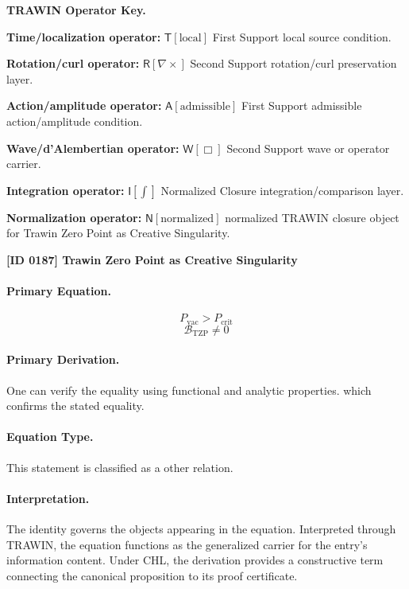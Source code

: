 \par\vspace{0.45\baselineskip}
\noindent\begin{minipage}[t]{\linewidth}
\begingroup
\small
\raggedright
\textbf{TRAWIN Operator Key.}\par
\noindent\textbf{Time/localization operator:} $\mathsf{T}\!\left[\mathrm{local}\right]$ First Support local source condition.\par
\noindent\textbf{Rotation/curl operator:} $\mathsf{R}\!\left[\nabla\times\right]$ Second Support rotation/curl preservation layer.\par
\noindent\textbf{Action/amplitude operator:} $\mathsf{A}\!\left[\mathrm{admissible}\right]$ First Support admissible action/amplitude condition.\par
\noindent\textbf{Wave/d'Alembertian operator:} $\mathsf{W}\!\left[\Box\right]$ Second Support wave or operator carrier.\par
\noindent\textbf{Integration operator:} $\mathsf{I}\!\left[\int\right]$ Normalized Closure integration/comparison layer.\par
\noindent\textbf{Normalization operator:} $\mathsf{N}\!\left[\mathrm{normalized}\right]$ normalized TRAWIN closure object for Trawin Zero Point as Creative Singularity.\par
\endgroup
\end{minipage}

\clearpage
\noindent\textbf{[ID 0187] Trawin Zero Point as Creative Singularity}\par
\vspace{0.35em}
\paragraph{Primary Equation.}
\[
P_{\mathrm{vac}} > P_{\mathrm{crit}}
\]
\[
\mathcal{B}_{\mathrm{TZP}} \neq 0
\]

\paragraph{Primary Derivation.}
One can verify the equality using functional and analytic properties. which confirms the stated equality.
\paragraph{Equation Type.}
This statement is classified as a other relation.

\paragraph{Interpretation.}
The identity governs the objects appearing in the equation. Interpreted through TRAWIN, the equation functions as the generalized carrier for the entry’s information content. Under CHL, the derivation provides a constructive term connecting the canonical proposition to its proof certificate.

